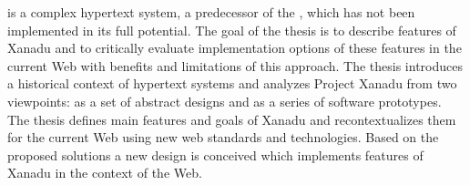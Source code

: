  is a complex hypertext system, a predecessor of the , which has not been implemented in its full potential.
The goal of the thesis is to describe features of Xanadu and to critically evaluate implementation options of these features in the current Web with benefits and limitations of this approach.
The thesis introduces a historical context of hypertext systems and analyzes Project Xanadu from two viewpoints: as a set of abstract designs and as a series of software prototypes. The thesis defines main features and goals of Xanadu and recontextualizes them for the current Web using new web standards and technologies. Based on the proposed solutions a new design is conceived which implements features of Xanadu in the context of the Web.